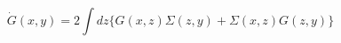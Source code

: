 \begin{equation}
\dot{G}(x,y) =  2 \int dz  \{G(x,z) \Sigma(z,y) + \Sigma (x,z) G(z,y) \}
\label{eq:gr}
\end{equation}

